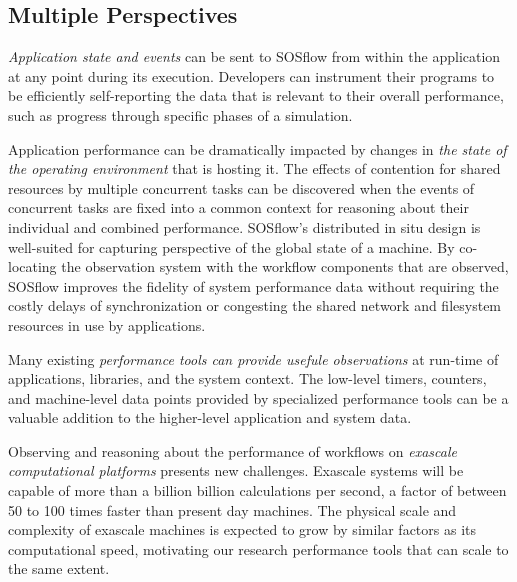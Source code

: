 \subsection{Multiple Perspectives} %
%
\textit{Application state and events} can be sent to SOSflow from
within the application at any point during its execution.
%
Developers can instrument their programs to be efficiently self-reporting
the data that is relevant to their overall performance, such as progress
through specific phases of a simulation.
%
\par
%

Application performance can be dramatically impacted by changes in
\textit{the state of the operating environment} that is hosting it.
%
The effects of contention for shared resources by multiple concurrent
tasks can be discovered when the events of concurrent tasks are fixed
into a common context for reasoning about their individual and
combined performance.
%
SOSflow's distributed in situ design is well-suited for capturing
perspective of the global state of a machine.
%
By co-locating the observation system with the workflow components
that are observed, SOSflow improves the fidelity of system performance
data without requiring the costly delays of synchronization or
congesting the shared network and filesystem resources in use by
applications.
%
\par
%
Many existing \textit{performance tools can provide usefule
  observations} at run-time of applications, libraries, and the system
context.
%
The low-level timers, counters, and machine-level data points provided
by specialized performance tools can be a valuable addition to the
higher-level application and system data.
%
\par
%
Observing and reasoning about the performance of workflows on
\textit{exascale computational platforms} presents new challenges.
%
Exascale systems will be capable of more than a billion billion
calculations per second, a factor of between 50 to 100 times
faster than present day machines.
%
The physical scale and complexity of exascale machines is expected to grow
by similar factors as its computational speed, motivating our research
performance tools that can scale to the same extent.
%
%





